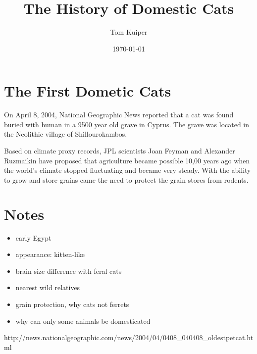 \documentclass[letterpaper,11pt]{article}
\title{The History of Domestic Cats}
\author{Tom Kuiper}
\date{\today}
\begin{document}
\maketitle

\section{The First Dometic Cats}

On April 8, 2004, National Geographic News reported that a cat was found buried
with human in a 9500 year old grave in Cyprus\cite{natgeo2004}.  The grave was 
located in the Neolithic village of Shillourokambos.

Based on climate proxy records, JPL scientists Joan Feyman and Alexander 
Ruzmaikin have proposed that agriculture became possible 10,00 years ago when
the world's climate stopped fluctuating and became very steady.  With the
ability to grow and store grains came the need to protect the grain stores from
rodents.

\appendix
\section{Notes}
\begin{itemize}
 \item early Egypt
 \item appearance: kitten-like
 \item brain size difference with feral cats
 \item nearest wild relatives
 \item grain protection, why cats not ferrets
 \item why can only some animals be domesticated
\end{itemize}

\begin{thebibliography}{1999}
 http://news.nationalgeographic.com/news/2004/04/0408\_040408\_oldestpetcat.html
\end{thebibliography}
\end{document}
